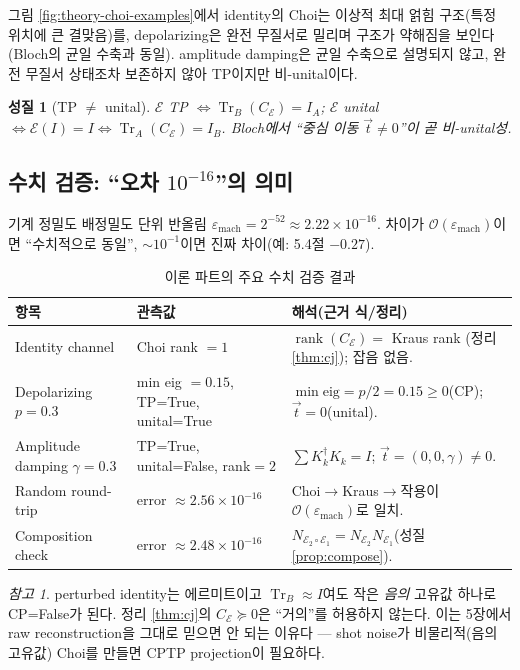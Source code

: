 \documentclass[11pt,a4paper]{article}
\newcommand{\E}{\mathcal{E}}
\newcommand{\Tr}{\operatorname{Tr}}
\newcommand{\rank}{\operatorname{rank}}
\theoremstyle{definition}
\theoremstyle{plain}
\newtheorem{property}{성질}[section]
\theoremstyle{remark}
\newtheorem*{remark}{참고}
\begin{document}
그림 \ref{fig:theory-choi-examples}에서 identity의 Choi는 이상적 최대 얽힘 구조(특정 위치에 큰 결맞음)를, depolarizing은 완전 무질서로 밀리며 구조가 약해짐을 보인다(Bloch의 균일 수축과 동일). amplitude damping은 균일 수축으로 설명되지 않고, 완전 무질서 상태조차 보존하지 않아 TP이지만 비-unital이다.

\begin{property}[TP $\neq$ unital]
$\E$ TP $\iff\Tr_B(C_\E)=I_A$; $\E$ unital $\iff\E(I)=I\iff\Tr_A(C_\E)=I_B$. Bloch에서 ``중심 이동 $\vec t\neq0$''이 곧 비-unital성.
\end{property}

\subsection{수치 검증: ``오차 $10^{-16}$''의 의미}

\begin{mathbox}{기계 정밀도}
배정밀도 단위 반올림 $\varepsilon_{\mathrm{mach}}=2^{-52}\approx2.22\times10^{-16}$. 차이가 $\mathcal O(\varepsilon_{\mathrm{mach}})$이면 ``수치적으로 동일'', $\sim10^{-1}$이면 진짜 차이(예: 5.4절 $-0.27$).
\end{mathbox}

\begin{table}[H]
\centering\small
\begin{tabularx}{\textwidth}{p{}p{}X}
\toprule
항목 & 관측값 & 해석(근거 식/정리) \\
\midrule
Identity channel & Choi rank $=1$ & $\rank(C_\E)=$ Kraus rank (정리 \ref{thm:cj}); 잡음 없음. \\
Depolarizing $p=0.3$ & min eig $=0.15$, TP=True, unital=True & $\min\mathrm{eig}=p/2=0.15\ge0$(CP); $\vec t=0$(unital). \\
Amplitude damping $\gamma=0.3$ & TP=True, unital=False, rank$=2$ & $\sum K_k^\dagger K_k=I$; $\vec t=(0,0,\gamma)\neq0$. \\
Random round-trip & error $\approx2.56\times10^{-16}$ & Choi$\to$Kraus$\to$작용이 $\mathcal O(\varepsilon_{\mathrm{mach}})$로 일치. \\
Composition check & error $\approx2.48\times10^{-16}$ & $N_{\E_2\circ\E_1}=N_{\E_2}N_{\E_1}$(성질 \ref{prop:compose}). \\
\bottomrule
\end{tabularx}
\caption{이론 파트의 주요 수치 검증 결과}
\label{tab:theory-results}
\end{table}

\begin{remark}
perturbed identity는 에르미트이고 $\Tr_B\approx I$여도 작은 \emph{음의} 고유값 하나로 CP=False가 된다. 정리 \ref{thm:cj}의 $C_\E\succeq0$은 ``거의''를 허용하지 않는다. 이는 5장에서 raw reconstruction을 그대로 믿으면 안 되는 이유다 --- shot noise가 비물리적(음의 고유값) Choi를 만들면 CPTP projection이 필요하다.
\end{remark}
\end{document}
